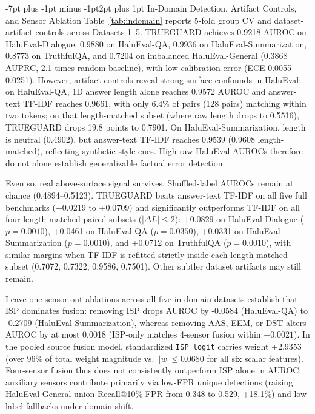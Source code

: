 \documentclass[10pt,twocolumn,letterpaper]{article}
\makeatletter
\renewcommand{\subsection}{\@startsection{subsection}{2}{\z@}%
  {-7pt plus -1pt minus -1pt}{2pt plus 1pt}%
  {\normalfont\normalsize\itshape\color{black}}}
\makeatother
\begin{document}
\subsection{In-Domain Detection, Artifact Controls, and Sensor Ablation}
Table~\ref{tab:indomain} reports 5-fold group CV and dataset-artifact controls across Datasets 1--5. TRUEGUARD achieves 0.9218 AUROC on HaluEval-Dialogue, 0.9880 on HaluEval-QA, 0.9936 on HaluEval-Summarization, 0.8773 on TruthfulQA, and 0.7204 on imbalanced HaluEval-General (0.3868 AUPRC, 2.1 times random baseline), with low calibration error (ECE 0.0055--0.0251). However, artifact controls reveal strong surface confounds in HaluEval: on HaluEval-QA, 1D answer length alone reaches 0.9572 AUROC and answer-text TF-IDF reaches 0.9661, with only 6.4\% of pairs (128 pairs) matching within two tokens; on that length-matched subset (where raw length drops to 0.5516), TRUEGUARD drops 19.8 points to 0.7901. On HaluEval-Summarization, length is neutral (0.4902), but answer-text TF-IDF reaches 0.9539 (0.9608 length-matched), reflecting synthetic style cues. High raw HaluEval AUROCs therefore do not alone establish generalizable factual error detection.

Even so, real above-surface signal survives. Shuffled-label AUROCs remain at chance (0.4894--0.5123). TRUEGUARD beats answer-text TF-IDF on all five full benchmarks (+0.0219 to +0.0709) and significantly outperforms TF-IDF on all four length-matched paired subsets ($|\Delta L| \le 2$): +0.0829 on HaluEval-Dialogue ($p = 0.0010$), +0.0461 on HaluEval-QA ($p = 0.0350$), +0.0331 on HaluEval-Summarization ($p = 0.0010$), and +0.0712 on TruthfulQA ($p = 0.0010$), with similar margins when TF-IDF is refitted strictly inside each length-matched subset (0.7072, 0.7322, 0.9586, 0.7501). Other subtler dataset artifacts may still remain.

Leave-one-sensor-out ablations across all five in-domain datasets establish that ISP dominates fusion: removing ISP drops AUROC by -0.0584 (HaluEval-QA) to -0.2709 (HaluEval-Summarization), whereas removing AAS, EEM, or DST alters AUROC by at most 0.0018 (ISP-only matches 4-sensor fusion within $\pm 0.0021$). In the pooled source fusion model, standardized \texttt{ISP\_logit} carries weight +2.9353 (over 96\% of total weight magnitude vs.\ $|w| \le 0.0680$ for all six scalar features). Four-sensor fusion thus does not consistently outperform ISP alone in AUROC; auxiliary sensors contribute primarily via low-FPR unique detections (raising HaluEval-General union Recall@10\% FPR from 0.348 to 0.529, +18.1\%) and low-label fallbacks under domain shift.
\end{document}

